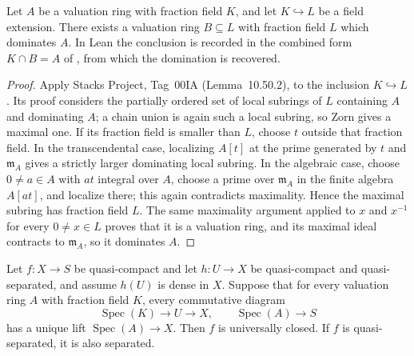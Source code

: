 \begin{lemma}
  \label{lemma:nagata-valuation-ring-extension}
  \leanok

  Let $A$ be a valuation ring with fraction field $K$, and let
  $K\hookrightarrow L$ be a field extension.  There exists a valuation ring
  $B\subseteq L$ with fraction field $L$ which dominates $A$.  In Lean the
  conclusion is recorded in the combined form $K\cap B=A$ of
  , from which the domination is
  recovered.
\end{lemma}

\begin{proof}
  \leanok
  Apply Stacks Project, Tag~00IA (Lemma~10.50.2), to the inclusion
  $K\hookrightarrow L$.  Its proof considers the partially ordered set of
  local subrings of $L$ containing $A$ and dominating $A$; a chain union is
  again such a local subring, so Zorn gives a maximal one.  If its fraction
  field is smaller than $L$, choose $t$ outside that fraction field.  In the
  transcendental case, localizing $A[t]$ at the prime generated by $t$ and
  $\mathfrak m_A$ gives a strictly larger dominating local subring.  In the
  algebraic case, choose $0\ne a\in A$ with $at$ integral over $A$, choose a
  prime over $\mathfrak m_A$ in the finite algebra $A[at]$, and localize
  there; this again contradicts maximality.  Hence the maximal subring has
  fraction field $L$.  The same maximality argument applied to $x$ and
  $x^{-1}$ for every $0\ne x\in L$ proves that it is a valuation ring, and
  its maximal ideal contracts to $\mathfrak m_A$, so it dominates $A$.
\end{proof}

\begin{lemma}
  \label{lemma:nagata-dense-source-valuative}
  \leanok

  Let \(f\colon X\to S\) be quasi-compact and let
  \(h\colon U\to X\) be quasi-compact and quasi-separated,
  and assume \(h(U)\) is dense in \(X\).  Suppose that for every valuation
  ring \(A\) with fraction field \(K\), every commutative diagram
  \[
    \operatorname{Spec}(K)\longrightarrow U\longrightarrow X,
    \qquad
    \operatorname{Spec}(A)\longrightarrow S
  \]
  has a unique lift \(\operatorname{Spec}(A)\to X\).  Then \(f\) is
  universally closed.  If \(f\) is quasi-separated, it is also separated.
\end{lemma}

